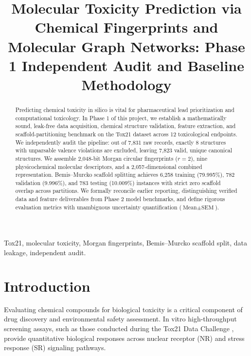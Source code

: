 \documentclass[conference]{IEEEtran}
\begin{document}
\title{Molecular Toxicity Prediction via Chemical Fingerprints and Molecular Graph Networks: Phase 1 Independent Audit and Baseline Methodology}

\author{
}

\maketitle

\begin{abstract}
Predicting chemical toxicity in silico is vital for pharmaceutical lead prioritization and computational toxicology. In Phase 1 of this project, we establish a mathematically sound, leak-free data acquisition, chemical structure validation, feature extraction, and scaffold-partitioning benchmark on the Tox21 dataset across 12 toxicological endpoints. We independently audit the pipeline: out of 7,831 raw records, exactly 8 structures with unparsable valence violations are excluded, leaving 7,823 valid, unique canonical structures. We assemble 2,048-bit Morgan circular fingerprints ($r=2$), nine physicochemical molecular descriptors, and a 2,057-dimensional combined representation. Bemis--Murcko scaffold splitting achieves 6,258 training (79.995\%), 782 validation (9.996\%), and 783 testing (10.009\%) instances with strict zero scaffold overlap across partitions. We formally reconcile earlier reporting, distinguishing verified data and feature deliverables from Phase 2 model benchmarks, and define rigorous evaluation metrics with unambiguous uncertainty quantification ($\text{Mean} \pm \text{SEM}$).
\end{abstract}

\begin{IEEEkeywords}
Tox21, molecular toxicity, Morgan fingerprints, Bemis--Murcko scaffold split, data leakage, independent audit.
\end{IEEEkeywords}

\section{Introduction}
Evaluating chemical compounds for biological toxicity is a critical component of drug discovery and environmental safety assessment. In vitro high-throughput screening assays, such as those conducted during the Tox21 Data Challenge \cite{tox21_challenge}, provide quantitative biological responses across nuclear receptor (NR) and stress response (SR) signaling pathways.
\end{document}
